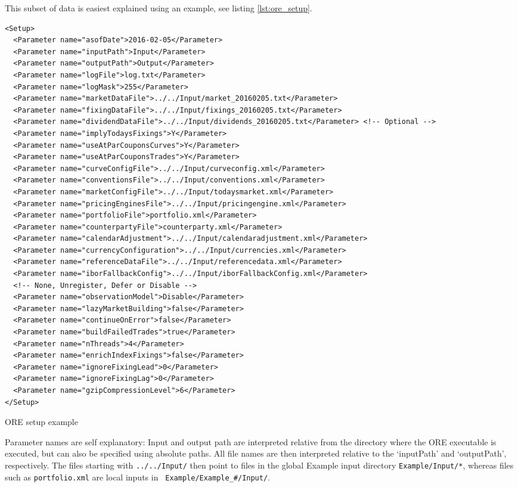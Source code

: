 This subset of data is easiest explained using an example, see listing \ref{lst:ore_setup}.
\begin{listing}[H]
\begin{verbatim}
<Setup>
  <Parameter name="asofDate">2016-02-05</Parameter>
  <Parameter name="inputPath">Input</Parameter>
  <Parameter name="outputPath">Output</Parameter>
  <Parameter name="logFile">log.txt</Parameter>
  <Parameter name="logMask">255</Parameter>
  <Parameter name="marketDataFile">../../Input/market_20160205.txt</Parameter>
  <Parameter name="fixingDataFile">../../Input/fixings_20160205.txt</Parameter>
  <Parameter name="dividendDataFile">../../Input/dividends_20160205.txt</Parameter> <!-- Optional -->
  <Parameter name="implyTodaysFixings">Y</Parameter>
  <Parameter name="useAtParCouponsCurves">Y</Parameter>
  <Parameter name="useAtParCouponsTrades">Y</Parameter>
  <Parameter name="curveConfigFile">../../Input/curveconfig.xml</Parameter>
  <Parameter name="conventionsFile">../../Input/conventions.xml</Parameter>
  <Parameter name="marketConfigFile">../../Input/todaysmarket.xml</Parameter>
  <Parameter name="pricingEnginesFile">../../Input/pricingengine.xml</Parameter>
  <Parameter name="portfolioFile">portfolio.xml</Parameter>
  <Parameter name="counterpartyFile">counterparty.xml</Parameter>
  <Parameter name="calendarAdjustment">../../Input/calendaradjustment.xml</Parameter>
  <Parameter name="currencyConfiguration">../../Input/currencies.xml</Parameter>
  <Parameter name="referenceDataFile">../../Input/referencedata.xml</Parameter>
  <Parameter name="iborFallbackConfig">../../Input/iborFallbackConfig.xml</Parameter>
  <!-- None, Unregister, Defer or Disable -->
  <Parameter name="observationModel">Disable</Parameter>
  <Parameter name="lazyMarketBuilding">false</Parameter>
  <Parameter name="continueOnError">false</Parameter>
  <Parameter name="buildFailedTrades">true</Parameter>
  <Parameter name="nThreads">4</Parameter>
  <Parameter name="enrichIndexFixings">false</Parameter>
  <Parameter name="ignoreFixingLead">0</Parameter>
  <Parameter name="ignoreFixingLag">0</Parameter>
  <Parameter name="gzipCompressionLevel">6</Parameter>
</Setup>
\end{verbatim}
\caption{ORE setup example}
\label{lst:ore_setup}
\end{listing}

Parameter names are self explanatory: Input and output path are interpreted relative from the directory where the ORE
executable is executed, but can also be specified using absolute paths. All file names are then interpreted relative to the
`inputPath' and `outputPath', respectively. The files starting with {\tt ../../Input/} then point to files in the global
Example input directory {\tt Example/Input/*}, whereas files such as {\tt portfolio.xml} are local inputs in {\tt
Example/Example\_\#/Input/}.

